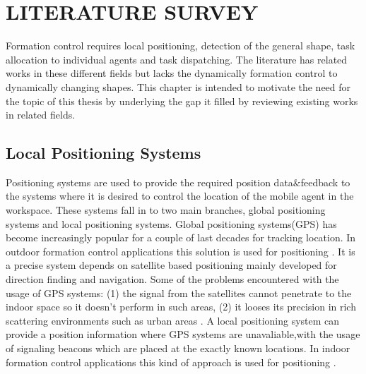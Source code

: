 

\chapter{LITERATURE SURVEY}
\label{chp:Literature Survey}







Formation control requires local positioning, detection of the general shape, task allocation to individual agents and task dispatching. The literature has related works in these different fields but lacks the dynamically formation control to dynamically changing shapes. This chapter is intended to motivate the need for the topic of this thesis by underlying the gap it filled by reviewing existing works in related fields. 
\section{Local Positioning Systems} \label{LPS_systems_ref}

Positioning systems are used to provide the required position data$\&$feedback to the systems where it is desired to control the location of the mobile agent in the workspace. 
These systems fall in to two main branches, global positioning systems and local positioning systems. Global positioning systems(GPS) has become increasingly popular for a couple of last decades for tracking location. In outdoor formation control applications this solution is used for positioning \cite{29}. It is a precise system depends on satellite based positioning mainly developed for direction finding and navigation.  Some of the problems encountered with the usage of GPS systems: (1) the signal from the satellites cannot penetrate to the indoor space so it doesn't perform in such areas, (2) it looses its precision in rich scattering environments such as urban areas \cite{19}.  A local positioning system can provide a position information where GPS systems are unavaliable,with the usage of signaling beacons which are placed at the exactly known locations. In indoor formation control applications this kind of approach is used for positioning \cite{96}. 




